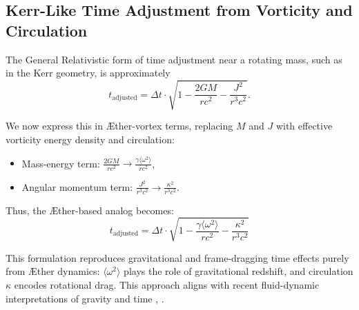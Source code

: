 \subsection*{Kerr-Like Time Adjustment from Vorticity and Circulation}

The General Relativistic form of time adjustment near a rotating mass, such as in the Kerr geometry, is approximately
\begin{equation}
    t_{\text{adjusted}} = \Delta t \cdot \sqrt{1 - \frac{2GM}{rc^2} - \frac{J^2}{r^3 c^2}}.
    \label{eq:kerrtime}
\end{equation}

We now express this in Æther-vortex terms, replacing $M$ and $J$ with effective vorticity energy density and circulation:
\begin{itemize}
    \item Mass-energy term: $\displaystyle \frac{2GM}{rc^2} \rightarrow \frac{\gamma \langle \omega^2 \rangle}{rc^2}$,
    \item Angular momentum term: $\displaystyle \frac{J^2}{r^3 c^2} \rightarrow \frac{\kappa^2}{r^3 c^2}$.
\end{itemize}

Thus, the Æther-based analog becomes:
\begin{equation}
    \boxed{
        t_{\text{adjusted}} = \Delta t \cdot \sqrt{
            1 - \frac{\gamma \langle \omega^2 \rangle}{r c^2}
            - \frac{\kappa^2}{r^3 c^2}
        }
    }
    \label{eq:ae_kerr}
\end{equation}

This formulation reproduces gravitational and frame-dragging time effects purely from Æther dynamics: $\langle \omega^2 \rangle$ plays the role of gravitational redshift, and circulation $\kappa$ encodes rotational drag. This approach aligns with recent fluid-dynamic interpretations of gravity and time \cite{barcelo2011analogue}, \cite{fedi2017gravity}.
